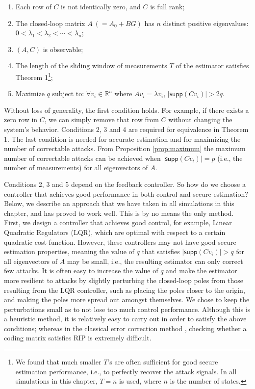 \documentclass[../../thesis.tex]{subfiles}
\begin{document}
\begin{enumerate}
	\item Each row of $C$ is not identically zero, and $C$ is full rank;
	\item The closed-loop matrix $A~(=A_0+BG)$ has $n$ distinct positive eigenvalues: $0< \lambda_1 < \lambda_2 < \cdots < \lambda _n$;
	\item $(A,C)$ is observable;
	\item The length of the sliding window of measurements $T$ of the estimator satisfies Theorem 1\footnote{We found that much smaller $T$'s are often sufficient for good secure estimation performance, i.e., to perfectly recover the attack signals. In all simulations in this chapter, $T=n$ is used, where $n$ is the number of states.};
	\item Maximize $q$ subject to: $\forall v_i \in \mathbb{R}^n$ where $Av_i = \lambda v_i$, $\lvert \textsf{supp} (C v_i)  \rvert > 2q$.
\end{enumerate}
Without loss of generality, the first condition holds. For example, if there exists a zero row in $C$, we can simply remove that row from $C$ without changing the system's behavior. Conditions 2, 3 and 4 are required for equivalence in Theorem 1. The last condition is needed for accurate estimation and for maximizing the number of correctable attacks. From Proposition \ref{prop:maximum} the maximum number of correctable attacks can be achieved when $\lvert \textsf{supp} (C v_i)  \rvert = p$ (i.e., the number of measurements) for all eigenvectors of $A$. 

Conditions 2, 3 and 5 depend on the feedback controller. So how do we choose a controller that achieves good performance in both control and secure estimation? Below, we describe an approach that we have taken in all simulations in this chapter, and has proved to work well. This is by no means the only method. First, we design a controller that achieves good control, for example, Linear Quadratic Regulators (LQR), which are optimal with respect to a certain quadratic cost function. However, these controllers may not have good secure estimation properties, meaning the value of $q$ that satisfies $\lvert \textsf{supp} (C v_i) \rvert > q$ for all eigenvectors of $A$ may be small, i.e., the resulting estimator can only correct few attacks. It is often easy to increase the value of $q$ and make the estimator more resilient to attacks by slightly perturbing the closed-loop poles from those resulting from the LQR controller, such as placing the poles closer to the origin, and making the poles more spread out amongst themselves. We chose to keep the perturbations small as to not lose too much control performance.  
Although this is a heuristic method, it is relatively easy to carry out in order to satisfy the above conditions; whereas in the classical error correction method \cite{tao11}, checking whether a coding matrix satisfies RIP is extremely difficult.
\end{document}
